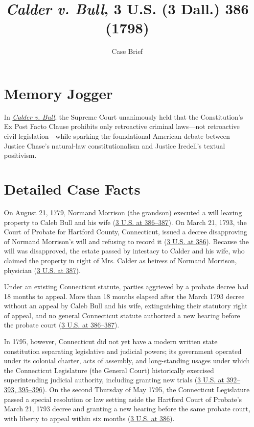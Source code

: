 \documentclass[12pt]{article}
\title{\textit{Calder v. Bull}, 3 U.S. (3 Dall.) 386 (1798)}
\subtitle{Case Brief}
\author{}
\date{}
\begin{document}
\maketitle

\section{Memory Jogger}

In \href{https://www.courtlistener.com/opinion/84695/calder-v-bull/}{\textit{Calder v. Bull}}, the Supreme Court unanimously held that the Constitution's Ex Post Facto Clause prohibits only retroactive criminal laws---not retroactive civil legislation---while sparking the foundational American debate between Justice Chase's natural-law constitutionalism and Justice Iredell's textual positivism.

\section{Detailed Case Facts}

On August 21, 1779, Normand Morrison (the grandson) executed a will leaving property to Caleb Bull and his wife (\href{https://supreme.justia.com/cases/federal/us/3/386/}{3 U.S. at 386--387}). On March 21, 1793, the Court of Probate for Hartford County, Connecticut, issued a decree disapproving of Normand Morrison's will and refusing to record it (\href{https://supreme.justia.com/cases/federal/us/3/386/}{3 U.S. at 386}). Because the will was disapproved, the estate passed by intestacy to Calder and his wife, who claimed the property in right of Mrs. Calder as heiress of Normand Morrison, physician (\href{https://supreme.justia.com/cases/federal/us/3/386/}{3 U.S. at 387}).

Under an existing Connecticut statute, parties aggrieved by a probate decree had 18 months to appeal. More than 18 months elapsed after the March 1793 decree without an appeal by Caleb Bull and his wife, extinguishing their statutory right of appeal, and no general Connecticut statute authorized a new hearing before the probate court (\href{https://supreme.justia.com/cases/federal/us/3/386/}{3 U.S. at 386--387}).

In 1795, however, Connecticut did not yet have a modern written state constitution separating legislative and judicial powers; its government operated under its colonial charter, acts of assembly, and long-standing usages under which the Connecticut Legislature (the General Court) historically exercised superintending judicial authority, including granting new trials (\href{https://press-pubs.uchicago.edu/founders/documents/a1_10_1s10.html}{3 U.S. at 392--393, 395--396}). On the second Thursday of May 1795, the Connecticut Legislature passed a special resolution or law setting aside the Hartford Court of Probate's March 21, 1793 decree and granting a new hearing before the same probate court, with liberty to appeal within six months (\href{https://supreme.justia.com/cases/federal/us/3/386/}{3 U.S. at 386}).
\end{document}
